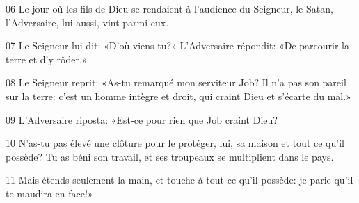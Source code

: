 
06 Le jour où les fils de Dieu se rendaient à l’audience du Seigneur, le Satan, l’Adversaire, lui aussi, vint parmi eux.

07 Le Seigneur lui dit: «D’où viens-tu?» L’Adversaire répondit: «De parcourir la terre et d’y rôder.»

08 Le Seigneur reprit: «As-tu remarqué mon serviteur Job? Il n’a pas son pareil sur la terre: c’est un homme intègre et droit, qui craint Dieu et s’écarte du mal.»

09 L’Adversaire riposta: «Est-ce pour rien que Job craint Dieu?

10 N’as-tu pas élevé une clôture pour le protéger, lui, sa maison et tout ce qu’il possède? Tu as béni son travail, et ses troupeaux se multiplient dans le pays.

11 Mais étends seulement la main, et touche à tout ce qu’il possède: je parie qu’il te maudira en face!»
